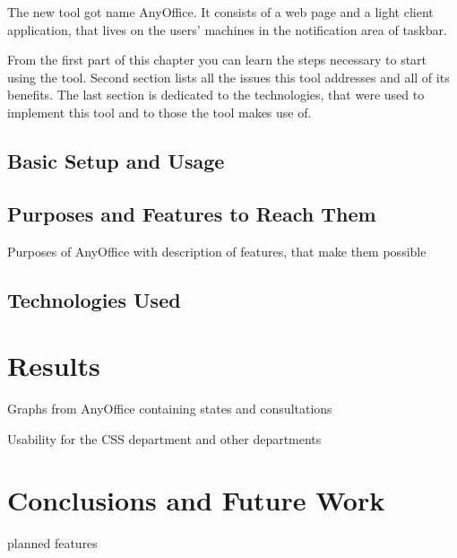 \documentclass[11pt,singleside]{myfithesis2}
\begin{document}
The new tool got name AnyOffice. It consists of a web page and a light client application, that lives on the users' machines in the notification area of taskbar.

From the first part of this chapter you can learn the steps necessary to start using the tool. Second section lists all the issues this tool addresses and all of its benefits. The last section is dedicated to the technologies, that were used to implement this tool and to those the tool makes use of.

	\section{Basic Setup and Usage}



	\section{Purposes and Features to Reach Them}
Purposes of AnyOffice with description of features, that make them possible

	\section{Technologies Used}

\chapter{Results}
Graphs from AnyOffice containing states and consultations

Usability for the CSS department and other departments

\chapter{Conclusions and Future Work}

planned features



\clearpage
{}
{}

\appendix
\end{document}
